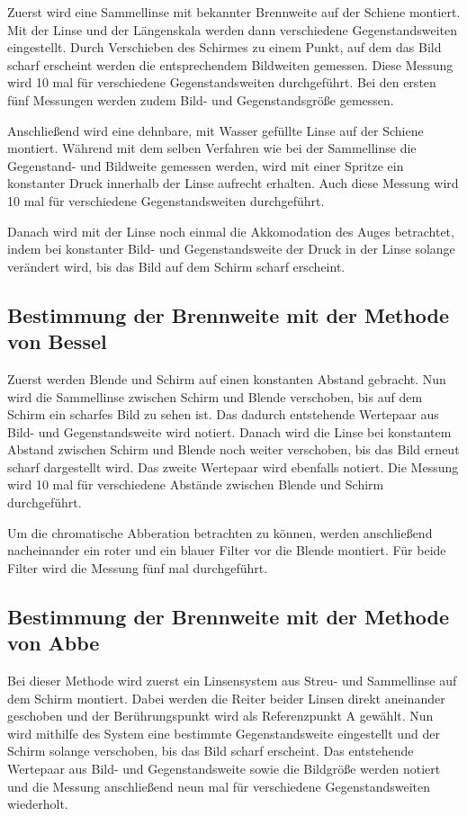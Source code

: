 Zuerst wird eine Sammellinse mit bekannter Brennweite auf der Schiene montiert.
Mit der Linse und der
Längenskala werden dann verschiedene Gegenstandsweiten eingestellt. Durch
Verschieben des Schirmes zu einem Punkt, auf dem das Bild scharf erscheint
werden die entsprechendem Bildweiten gemessen. Diese Messung wird 10 mal für
verschiedene Gegenstandsweiten durchgeführt.
Bei den ersten fünf Messungen werden zudem Bild- und Gegenstandsgröße gemessen.

Anschließend wird eine dehnbare, mit Wasser gefüllte Linse auf der Schiene montiert.
Während mit dem selben Verfahren wie bei der Sammellinse die Gegenstand- und Bildweite
gemessen werden, wird mit einer Spritze ein konstanter Druck innerhalb der
Linse aufrecht erhalten. Auch diese Messung wird 10 mal für verschiedene
Gegenstandsweiten durchgeführt.

Danach wird mit der Linse noch einmal die Akkomodation des Auges betrachtet, indem
bei konstanter Bild- und Gegenstandsweite der Druck in der Linse solange verändert
wird, bis das Bild auf dem Schirm scharf erscheint.

\subsection{Bestimmung der Brennweite mit der Methode von Bessel}

Zuerst werden Blende und Schirm auf einen konstanten Abstand gebracht. Nun
wird die Sammellinse zwischen Schirm und Blende verschoben, bis auf dem Schirm
ein scharfes Bild zu sehen ist. Das dadurch entstehende Wertepaar aus Bild-
und Gegenstandsweite wird notiert. Danach wird die Linse bei konstantem Abstand
zwischen Schirm und Blende noch weiter verschoben, bis das Bild erneut scharf
dargestellt wird. Das zweite Wertepaar wird ebenfalls notiert. Die Messung
wird 10 mal für verschiedene Abstände zwischen Blende und Schirm durchgeführt.

Um die chromatische Abberation betrachten zu können, werden
anschließend nacheinander ein roter und ein blauer Filter vor die
Blende montiert. Für beide Filter wird die Messung fünf mal durchgeführt.

\subsection{Bestimmung der Brennweite mit der Methode von Abbe}

Bei dieser Methode wird zuerst ein Linsensystem aus Streu- und Sammellinse auf
dem Schirm montiert. Dabei werden die Reiter beider Linsen direkt aneinander
geschoben und der Berührungspunkt wird als Referenzpunkt A gewählt. Nun wird
mithilfe des System eine bestimmte Gegenstandsweite eingestellt und der Schirm
solange verschoben, bis das Bild scharf erscheint. Das entstehende Wertepaar aus
Bild- und Gegenstandsweite sowie die Bildgröße werden notiert und die Messung
anschließend neun mal für verschiedene Gegenstandsweiten wiederholt.

